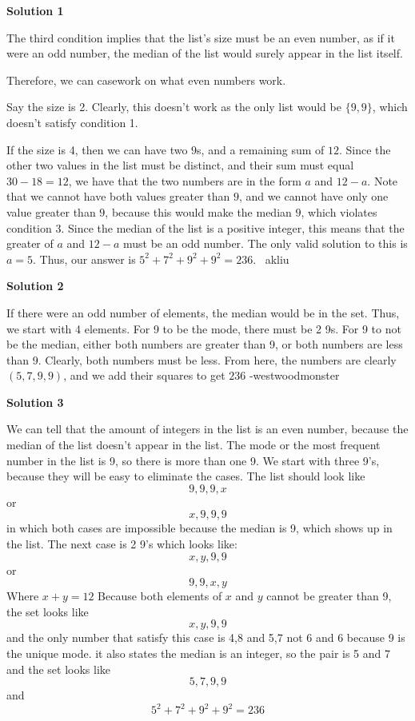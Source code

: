 \begin{enumerate}
\textbf{Solution 1}

The third condition implies that the list's size must be an even number, as if it were an odd number, the median of the list would surely appear in the list itself.

 Therefore, we can casework on what even numbers work.

 Say the size is 2. Clearly, this doesn't work as the only list would be $\{9, 9\}$, which doesn't satisfy condition 1.

 If the size is 4, then we can have two $9$s, and a remaining sum of $12$. Since the other two values in the list must be distinct, and their sum must equal $30-18=12$, we have that the two numbers are in the form $a$ and $12-a$. Note that we cannot have both values greater than $9$, and we cannot have only one value greater than $9$, because this would make the median $9$, which violates condition 3. Since the median of the list is a positive integer, this means that the greater of $a$ and $12-a$ must be an odd number. The only valid solution to this is $a=5$. Thus, our answer is $5^2+7^2+9^2+9^2 = \boxed{236}$. ~akliu

 



\textbf{Solution 2}

If there were an odd number of elements, the median would be in the set. Thus, we start with 4 elements. For 9 to be the mode, there must be 2 9s. For 9 to not be the median, either both numbers are greater than 9, or both numbers are less than 9. Clearly, both numbers must be less. From here, the numbers are clearly $(5,7,9,9)$, and we add their squares to get $\boxed{236}$ -westwoodmonster

 


 



\textbf{Solution 3}

We can tell that the amount of integers in the list is an even number, because the median of the list doesn't appear in the list. The mode or the most frequent number in the list is 9, so there is more than one 9. We start with three 9's, because they will be easy to eliminate the cases. The list should look like 
 \[9,9,9,x\] or 
 \[x,9,9,9\]  in which both cases are impossible because the median is 9, which shows up in the list. The next case is 2 9's which looks like: 
 \[x,y,9,9\] or 
 \[9,9,x,y\] Where $x+y=12$ Because both elements of $x$ and $y$ cannot be greater than 9, the set looks like 
 \[x,y,9,9\] and the only number that satisfy this case is 4,8 and 5,7 not 6 and 6 because 9 is the unique mode. it also states the median is an integer, so the pair is 5 and 7 and the set looks like 
 \[5,7,9,9\] and 
 \[5^2+7^2+9^2+9^2=236\]


\end{enumerate}
